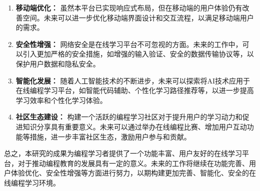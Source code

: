 \documentclass[12pt,a4paper]{article}
\begin{document}
\begin{CJK*}{UTF8}{gbsn}
\begin{enumerate}
    \item \textbf{移动端优化：} 虽然本平台已实现响应式布局，但在移动端的用户体验仍有改善空间。未来可以进一步优化移动端界面设计和交互流程，以满足移动端用户的需求。
    
    \item \textbf{安全性增强：} 网络安全是在线学习平台不可忽视的方面。未来的工作中，可以引入更加严格的安全措施，如增强的输入验证、安全的数据传输协议等，以保护用户数据和隐私安全。
    
    \item \textbf{智能化发展：} 随着人工智能技术的不断进步，未来可以探索将AI技术应用于在线编程学习平台，如智能代码辅助、个性化学习路径推荐等，以进一步提高学习效率和个性化学习体验。
    
    \item \textbf{社区生态建设：} 构建一个活跃的编程学习社区对于提升用户的学习动力和促进知识分享具有重要意义。未来可以通过举办在线编程比赛、增加用户互动功能等措施，进一步丰富社区生态，激励用户参与和贡献。
\end{enumerate}

总之，本研究的成果为编程学习者提供了一个功能丰富、用户友好的在线学习平台，对于推动编程教育的发展具有一定的意义。未来的工作将继续在功能完善、用户体验优化、安全性增强等方面进行努力，以期构建更加完善、智能化、安全的在线编程学习环境。

\newpage





\end{CJK*}
\end{document}
